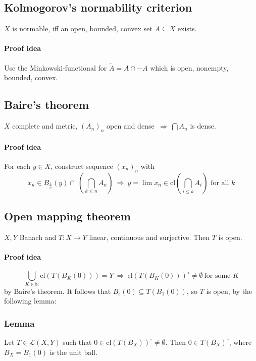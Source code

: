 \documentclass{scrartcl}
\newcommand{\N}{\mathbb{N}}
\begin{document}
\subsection{Kolmogorov's normability criterion}
$X$ is normable, iff an open, bounded, convex set $A \subseteq X$ exists.
\paragraph{Proof idea} Use the Minkowski-functional for $\tilde{A} = A \cap -A$ which is open, nonempty, bounded, convex.

\subsection{Baire's theorem}
$X$ complete and metric, $\left( A_n \right)_n$ open and dense $ \ \Rightarrow \ \bigcap A_n $ is dense.
\paragraph{Proof idea} For each $y \in X$, construct sequence $(x_n)_n$ with 
\begin{equation}
    x_n \in B_{\frac 1 n}(y) \cap \ \left( \bigcap_{k \leq n} A_n \right) \ \Rightarrow \ y = \lim x_n \in \mathrm{cl}\left( \bigcap_{i \leq k} A_i \right) \text{ for all } k \nonumber
\end{equation}

\subsection{Open mapping theorem}
$X, Y$ Banach and $T: X \to Y$ linear, continuous and surjective. Then $T$ is open.
\paragraph{Proof idea}
\begin{equation}
    \bigcup_{K \in \N} \mathrm{cl}\left(T(B_K(0))\right) = Y \ \Rightarrow \ \mathrm{cl}\left(T(B_K(0))\right)^\circ \neq \emptyset \ \text{for some } K\nonumber
\end{equation}
by Baire's theorem. It follows that $B_\epsilon(0) \subseteq T(B_1(0))$, so $T$ is open, by the following lemma:
\subsubsection{Lemma}
\label{closure_image_unit_ball}
Let $T \in \mathcal{L}(X, Y)$ such that $0 \in \mathrm{cl}(T(B_X))^\circ \neq \emptyset$. Then $0 \in T(B_X)^\circ$, where $B_X = B_1(0)$ is the unit ball.
\end{document}
